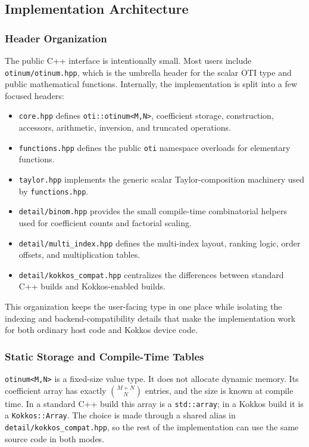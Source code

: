 \documentclass[11pt]{article}
\begin{document}
\subsection{Implementation Architecture}

\subsubsection{Header Organization}

The public C++ interface is intentionally small. Most users include
\texttt{otinum/otinum.hpp}, which is the umbrella header for the scalar OTI
type and public mathematical functions. Internally, the implementation is
split into a few focused headers:

\begin{itemize}[noitemsep]
    \item \texttt{core.hpp} defines \texttt{oti::otinum<M,N>}, coefficient
    storage, construction, accessors, arithmetic, inversion, and truncated
    operations.
    \item \texttt{functions.hpp} defines the public \texttt{oti} namespace
    overloads for elementary functions.
    \item \texttt{taylor.hpp} implements the generic scalar Taylor-composition
    machinery used by \texttt{functions.hpp}.
    \item \texttt{detail/binom.hpp} provides the small compile-time
    combinatorial helpers used for coefficient counts and factorial scaling.
    \item \texttt{detail/multi\_index.hpp} defines the multi-index layout,
    ranking logic, order offsets, and multiplication tables.
    \item \texttt{detail/kokkos\_compat.hpp} centralizes the differences
    between standard C++ builds and Kokkos-enabled builds.
\end{itemize}

This organization keeps the user-facing type in one place while isolating the
indexing and backend-compatibility details that make the implementation work
for both ordinary host code and Kokkos device code.

\subsubsection{Static Storage and Compile-Time Tables}

\texttt{otinum<M,N>} is a fixed-size value type. It does not allocate dynamic
memory. Its coefficient array has exactly \({M+N \choose N}\) entries, and the
size is known at compile time. In a standard C++ build this array is a
\texttt{std::array}; in a Kokkos build it is a \texttt{Kokkos::Array}. The
choice is made through a shared alias in \texttt{detail/kokkos\_compat.hpp},
so the rest of the implementation can use the same source code in both modes.
\end{document}
